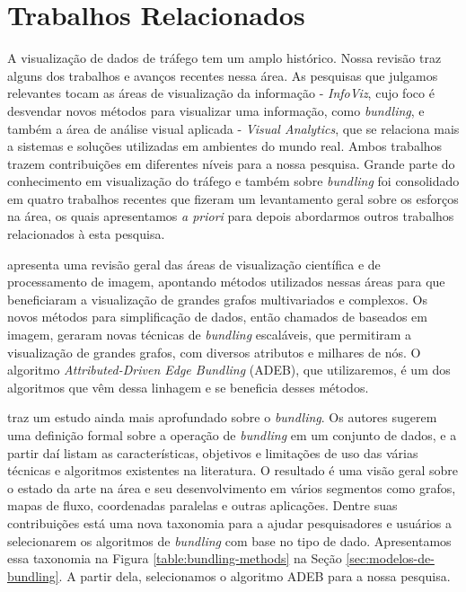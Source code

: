 \chapter{Trabalhos Relacionados}
\label{cap:trabalhos-relacionados}

  A visualização de dados de tráfego tem um amplo histórico. Nossa revisão traz
alguns dos trabalhos e avanços recentes nessa área. As pesquisas que julgamos
relevantes tocam as áreas de visualização da informação - \emph{InfoViz}, cujo
foco é desvendar novos métodos para visualizar uma informação, como
\emph{bundling}, e também a área de análise visual aplicada - \emph{Visual
Analytics}, que se relaciona mais a sistemas e soluções utilizadas em ambientes
do mundo real. Ambos trabalhos trazem contribuições em diferentes níveis para a
nossa pesquisa. Grande parte do conhecimento em visualização do tráfego e
também sobre \emph{bundling} foi consolidado em quatro trabalhos recentes que
fizeram um levantamento geral sobre os esforços na área, os quais apresentamos
\emph{a priori} para depois abordarmos outros trabalhos relacionados à esta
pesquisa.

  \citet{Telea2018} apresenta uma revisão geral das áreas de visualização
científica e de processamento de imagem, apontando métodos utilizados nessas
áreas para que beneficiaram a visualização de grandes grafos multivariados e
complexos. Os novos métodos para simplificação de dados, então chamados de
baseados em imagem, geraram novas técnicas de \emph{bundling} escaláveis, que
permitiram a visualização de grandes grafos, com diversos atributos e
milhares de nós. O algoritmo \emph{Attributed-Driven Edge Bundling} (ADEB), que utilizaremos,
é um dos algoritmos que vêm dessa linhagem e se beneficia desses métodos.

  \citet{Lhuillier2017} traz um estudo ainda mais aprofundado sobre o
\emph{bundling}. Os autores sugerem uma definição formal sobre a operação de
\emph{bundling} em um conjunto de dados, e a partir daí listam as
características, objetivos e limitações de uso das várias técnicas e algoritmos
existentes na literatura. O resultado é uma visão geral sobre o estado da arte
na área e seu desenvolvimento em vários segmentos como grafos, mapas de fluxo,
coordenadas paralelas e outras aplicações. Dentre suas contribuições está uma
nova taxonomia para a ajudar pesquisadores e usuários a selecionarem os
algoritmos de \emph{bundling} com base no tipo de dado.  Apresentamos essa
taxonomia na Figura \ref{table:bundling-methods} na Seção
\ref{sec:modelos-de-bundling}. A partir dela, selecionamos o algoritmo ADEB
para a nossa pesquisa.

